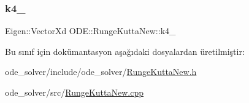 \subsubsection{\texorpdfstring{k4\_}{k4\_}}
{\footnotesize\ttfamily Eigen\+::\+Vector\+Xd O\+D\+E\+::\+Runge\+Kutta\+New\+::k4\+\_\+\hspace{0.3cm}{\ttfamily [protected]}}



Bu sınıf için dokümantasyon aşağıdaki dosyalardan üretilmiştir\+:\begin{DoxyCompactItemize}
\item 
ode\+\_\+solver/include/ode\+\_\+solver/\mbox{\hyperlink{RungeKuttaNew_8h}{Runge\+Kutta\+New.\+h}}\item 
ode\+\_\+solver/src/\mbox{\hyperlink{RungeKuttaNew_8cpp}{Runge\+Kutta\+New.\+cpp}}\end{DoxyCompactItemize}
